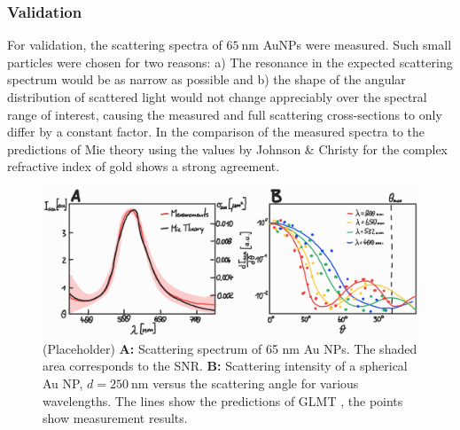 \documentclass[10pt]{article}
\begin{document}
\begin{multicols}{2}

\subsubsection*{Validation}



For validation, the scattering spectra of $\SI{65}{\nano\meter}$ AuNPs were measured. 
Such small particles were chosen for two reasons: 
a) The resonance in the expected scattering spectrum would be as narrow as possible and b) the shape of the angular distribution of scattered light would not change appreciably over the spectral range of interest, causing the measured and full scattering cross-sections to only differ by a constant factor. 
In the comparison of the measured spectra to the predictions of Mie theory \cite{Mie1908, BohrenHuffman, GouesbetGrehan} using the values by Johnson \& Christy \cite{Johnson1972} for the complex refractive index of gold shows a strong agreement. 

\begin{figure}[t]
    \centering
    \includegraphics[width=\textwidth]{[fig] AuNP (placeholder).jpg}
    \caption{(Placeholder) 
    {\sffamily\bfseries A:} Scattering spectrum of 65 nm Au NPs. The shaded area corresponds to the SNR. 
    {\sffamily\bfseries B:} Scattering intensity of a spherical Au NP, $d=\SI{250}{\nano\meter}$ versus the scattering angle for various wavelengths. The lines show the predictions of GLMT \cite{GouesbetGrehan}, the points show measurement results.
    }
    \label{fig:AuNP}
\end{figure}


\end{multicols}
\end{document}
